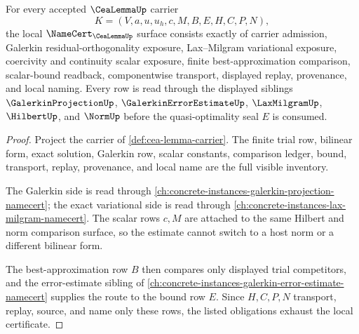 \begin{theorem}
\label{thm:cea-lemma-namecert-obligations}
For every accepted $\CeaLemmaUp$ carrier
$$
K=(V,a,u,u_h,c,M,B,E,H,C,P,N),
$$
the local $\NameCert_{\CeaLemmaUp}$ surface consists exactly of carrier admission, Galerkin residual-orthogonality exposure, Lax--Milgram variational exposure, coercivity and continuity scalar exposure, finite best-approximation comparison, scalar-bound readback, componentwise transport, displayed replay, provenance, and local naming. Every row is read through the displayed siblings $\GalerkinProjectionUp$, $\GalerkinErrorEstimateUp$, $\LaxMilgramUp$, $\HilbertUp$, and $\NormUp$ before the quasi-optimality seal $E$ is consumed.
\end{theorem}
\begin{proof}
Project the carrier of \autoref{def:cea-lemma-carrier}. The finite trial row, bilinear form, exact solution, Galerkin row, scalar constants, comparison ledger, bound, transport, replay, provenance, and local name are the full visible inventory.

The Galerkin side is read through \autoref{ch:concrete-instances-galerkin-projection-namecert}; the exact variational side is read through \autoref{ch:concrete-instances-lax-milgram-namecert}. The scalar rows $c,M$ are attached to the same Hilbert and norm comparison surface, so the estimate cannot switch to a host norm or a different bilinear form.

The best-approximation row $B$ then compares only displayed trial competitors, and the error-estimate sibling of \autoref{ch:concrete-instances-galerkin-error-estimate-namecert} supplies the route to the bound row $E$. Since $H,C,P,N$ transport, replay, source, and name only these rows, the listed obligations exhaust the local certificate.
\end{proof}

